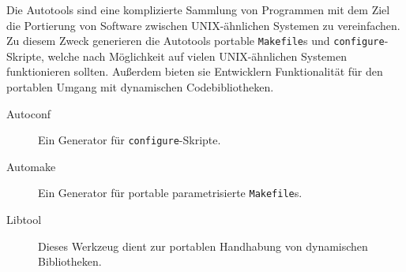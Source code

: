 Die Autotools  sind eine komplizierte
Sammlung von Programmen mit dem Ziel die Portierung von Software zwischen
UNIX-ähnlichen Systemen zu vereinfachen.
%
Zu diesem Zweck generieren die Autotools portable \texttt{Makefile}s und
\texttt{configure}-Skripte, welche nach Möglichkeit auf vielen UNIX-ähnlichen
Systemen funktionieren sollten. Außerdem bieten sie Entwicklern Funktionalität
für den portablen Umgang mit dynamischen Codebibliotheken.

\begin{description}
	\item[Autoconf] Ein Generator für \texttt{configure}-Skripte.
	\item[Automake] Ein Generator für portable parametrisierte
	\texttt{Makefile}s. 
	\item[Libtool] Dieses Werkzeug dient zur portablen Handhabung von
	dynamischen Bibliotheken.
\end{description}
